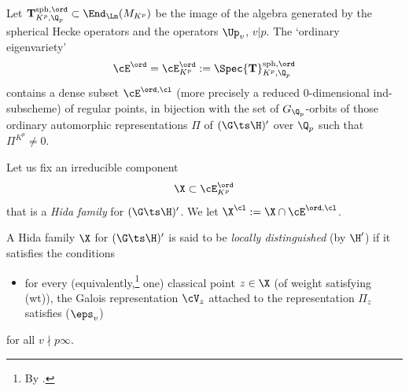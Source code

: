 Let ${\bf T}^{\rm sph, \ord}_{K^{p}, \Q_{p}}\subset \End_{\Lm}(M_{K^{p}})$ be the image of the algebra generated by the  spherical Hecke operators and the operators $\Up_{v}$, $v\vert p$. The `ordinary eigenvariety'
$$\cE^{\ord}=\cE^{\ord}_{K^{p}}:=  \Spec {\bf T}^{\rm sph, \ord}_{K^{p}, \Q_{p}}$$ contains a dense subset  $\cE^{\ord, \cl}$ (more precisely a reduced $0$-dimensional ind-subscheme) of regular points,  in bijection with the   set of $G_{\Q_{p}}$-orbits of those  ordinary automorphic representations $\Pi$ of $(\G\ts\H)'$ over $\Q_{p}$ such that  $\Pi^{K^{p}}\neq 0$.


Let us  fix an irreducible component
$$\X\subset\cE^{\ord}_{K^{p}}$$
that is a  \emph{Hida family} for $(\G\ts\H)'$. We let  $\X^{\cl}:=\X\cap\cE^{\ord, \cl}  $.


 \begin{defi}
\notready{}
A {Hida family} $\X$ for $(\G\ts \H)'$
is said to be \emph{locally distinguished} (by $\H'$) if it satisfies  the conditions
\begin{itemize}
\item[$(\eps_{v})'$]  for every (equivalently,\footnote{By \cite[Corollary 5.3.3]{LLC}.} one) classical point $z\in \X$ (of weight satisfying (wt)), the Galois representation $\cV_{z}$ attached to the representation $\Pi_{z}$ satisfies ($\eps_{v}$)
\end{itemize}
for all $v\nmid p\infty$.
\end{defi}


